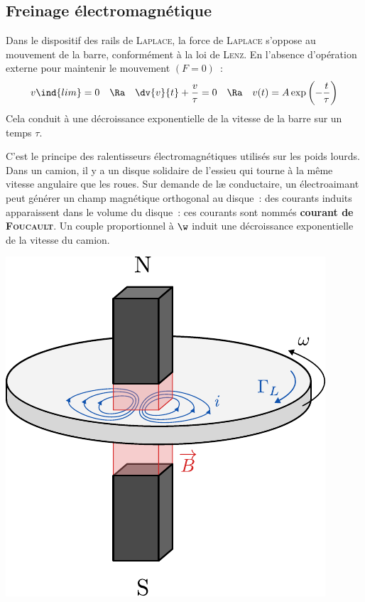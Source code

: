 \documentclass[../../main/main.tex]{subfiles}
\begin{document}
\subsection{Freinage électromagnétique}
\label{ssec:electrofrein}
Dans le dispositif des rails de \textsc{Laplace}, la force de \textsc{Laplace}
s'oppose au mouvement de la barre, conformément à la loi de \textsc{Lenz}. En
l'absence d'opération externe pour maintenir le mouvement $(F=0)$~:
\[
	v\ind{lim} = 0
	\quad \Ra \quad
	\dv{v}{t} + \frac{v}{\tau} = 0
	\quad \Ra \quad
	v(t) = A\exp\left(-\frac{t}{\tau}\right)
\]
Cela conduit à une décroissance exponentielle de la vitesse de la barre sur un
temps $\tau$.
\smallbreak
\noindent
\begin{minipage}[c]{.60\linewidth}
	C'est le principe des ralentisseurs électromagnétiques utilisés sur les poids
	lourds. Dans un camion, il y a un disque solidaire de l'essieu qui tourne à la
	même vitesse angulaire que les roues.
	\smallbreak
	Sur demande de læ conductaire, un électroaimant peut générer un champ
	magnétique orthogonal au disque~: des courants induits apparaissent dans le
	volume du disque~: ces courants sont nommés \textbf{courant de
		\textsc{Foucault}}.
	\smallbreak
	Un couple proportionnel à $\w$ induit une décroissance exponentielle de la
	vitesse du camion.
\end{minipage}
\hfill
\begin{minipage}[c]{.35\linewidth}
	\begin{center}
		\includegraphics[width=\linewidth]{frein_induc}
	\end{center}
\end{minipage}
\end{document}
